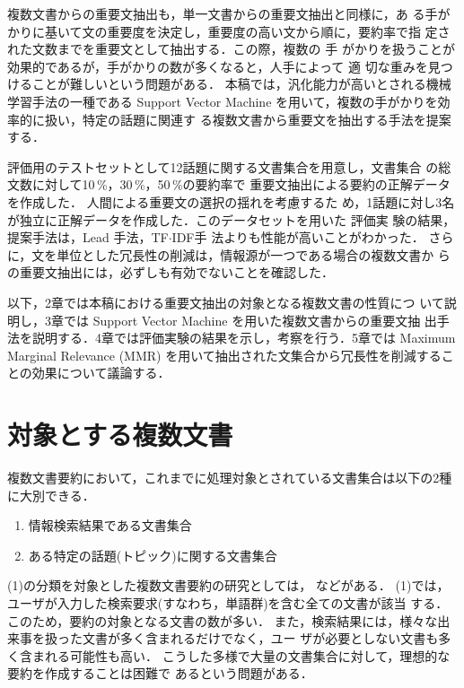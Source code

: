 複数文書からの重要文抽出も，単一文書からの重要文抽出と同様に，あ
る手がかりに基いて文の重要度を決定し，重要度の高い文から順に，要約率で指
定された文数までを重要文として抽出する．この際，複数の
手
がかりを扱うことが効果的であるが，手がかりの数が多くなると，人手によって
適
切な重みを見つけることが難しいという問題がある．
本稿では，汎化能力が高いとされる機械学習手法の一種である Support Vector
Machine を用いて，複数の手がかりを効率的に扱い，特定の話題に関連す
る複数文書から重要文を抽出する手法を提案する．

評価用のテストセットとして12話題に関する文書集合を用意し，文書集合
の総文数に対して10\,\%，30\,\%，50\,\%の要約率で
重要文抽出による要約の正解データを作成した．
人間による重要文の選択の揺れを考慮するた
め，1話題に対し3名が独立に正解データを作成した．このデータセットを用いた
評価実
験の結果，提案手法は，Lead 手法，TF$\cdot$IDF手
法よりも性能が高いことがわかった．
さらに，文を単位とした冗長性の削減は，情報源が一つである場合の複数文書か
らの重要文抽出には，必ずしも有効でないことを確認した．

以下，2章では本稿における重要文抽出の対象となる複数文書の性質につ
いて説明し，3章では Support Vector Machine を用いた複数文書からの重要文抽
出手法を説明する．4章では評価実験の結果を示し，考察を行う．5章では
Maximum Marginal Relevance (MMR) \cite{article48}
を用いて抽出された文集合から冗長性を削減することの効果について議論する．

\section{対象とする複数文書}

複数文書要約において，これまでに処理対象とされている文書集合は以下の2種
に大別できる\cite{article8}．

\begin{enumerate}
 \item[(1)] 情報検索結果である文書集合
 \item[(2)] ある特定の話題(トピック)に関する文書集合
\end{enumerate}

(1)の分類を対象とした複数文書要約の研究としては，
\cite{article41}などがある．
(1)では，ユーザが入力した検索要求(すなわち，単語群)を含む全ての文書が該当
する．
このため，要約の対象となる文書の数が多い．
また，検索結果には，様々な出来事を扱った文書が多く含まれるだけでなく，ユー
ザが必要としない文書も多く含まれる可能性も高い．
こうした多様で大量の文書集合に対して，理想的な要約を作成することは困難で
あるという問題がある．

